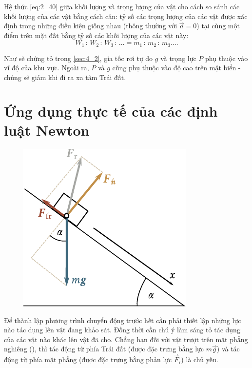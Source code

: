 Hệ thức \eqref{eq:2_40} giữa khối lượng và trọng lượng của vật cho cách so sánh các khối lượng của các vật bằng cách cân: tỷ số các trọng lượng của các vật được xác định trong những điều kiện giống nhau (thông thường với $\vec{a}=0$) tại cùng một điểm trên mặt đất bằng tỷ số các khối lượng của các vật này:
\begin{equation*}
W_1\,:\,W_2\,:\,W_3\,:\,\ldots = m_1\,:\,m_2\,:\,m_3\ldots.
\end{equation*}

Như sẽ chứng tỏ trong \ref{sec:4_2}, gia tốc rơi tự do $g$ và trọng lực $P$ phụ thuộc vào vĩ độ của khu vực. Ngoài ra, $P$ và $g$ cũng phụ thuộc vào độ cao trên mặt biển - chúng sẽ giảm khi đi ra xa tâm Trái đất.

\section{Ứng dụng thực tế của các định luật Newton}\label{sec:2_12}

\begin{figure}[!htb]
	\begin{center}
		\includegraphics[scale=1]{figures/ch_02/fig_2_12.pdf}
		\caption[]{}
		\label{fig:2_12}
	\end{center}
\end{figure}

Để thành lập phương trình chuyển động trước hết cần phải thiết lập những lực nào tác dụng lên vật đang khảo sát. Đồng thời cần chú ý làm sáng tỏ tác dụng của các vật nào khác lên vật đã cho. Chẳng hạn đối với vật trượt trên mặt phẳng nghiêng (), thì tác động từ phía Trái đất (được đặc trưng bằng lực $m\vec{g}$) và tác động từ phía mặt phẳng (được đặc trưng bằng phản lực $\vec{F}_{\text{r}}$) là chủ yếu.

